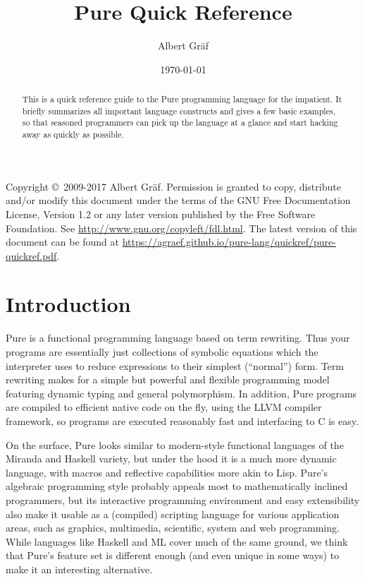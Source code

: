 \documentclass[a4paper,12pt]{article}
\title{\LARGE\usefont{OT1}{phv}{bc}{n} Pure Quick Reference}
\author{\large\usefont{OT1}{phv}{m}{n} Albert Gr\"af}
\date{\small\usefont{OT1}{phv}{mc}{n}\today}
\begin{document}
\maketitle

\begin{abstract}
This is a quick reference guide to the Pure programming language for the impatient. It briefly summarizes all important language constructs and gives a few basic examples, so that seasoned programmers can pick up the language at a glance and start hacking away as quickly as possible.
\end{abstract}

{\noindent\footnotesize Copyright \copyright\ 2009-2017 Albert Gr\"af. Permission is granted to copy, distribute and/or modify this document under the terms of the GNU Free Documentation License, Version 1.2 or any later version published by the Free Software Foundation. See \url{http://www.gnu.org/copyleft/fdl.html}. The latest version of this document can be found at \url{https://agraef.github.io/pure-lang/quickref/pure-quickref.pdf}.}

\tableofcontents


\section{Introduction}
\label{Introduction}

Pure is a functional programming language based on term rewriting. Thus your programs are essentially just collections of symbolic equations which the interpreter uses to reduce expressions to their simplest (``normal'') form. Term rewriting makes for a simple but powerful and flexible programming model featuring dynamic typing and general polymorphism. In addition, Pure programs are compiled to efficient native code on the fly, using the LLVM compiler framework, so programs are executed reasonably fast and interfacing to C is easy.

On the surface, Pure looks similar to modern-style functional languages of the Miranda and Haskell variety, but under the hood it is a much more dynamic language, with macros and reflective capabilities more akin to Lisp. Pure's algebraic programming style probably appeals most to mathematically inclined programmers, but its interactive programming environment and easy extensibility also make it usable as a (compiled) scripting language for various application areas, such as graphics, multimedia, scien\-ti\-fic, system and web programming. While languages like Haskell and ML cover much of the same ground, we think that Pure's feature set is different enough (and even unique in some ways) to make it an interesting alternative.
\end{document}
